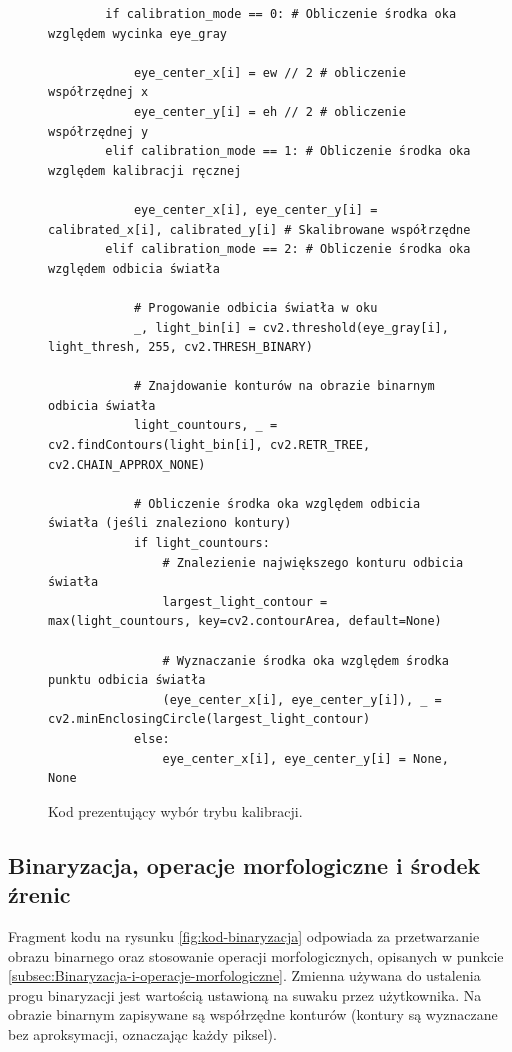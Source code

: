\documentclass[a4paper,twoside,12pt]{book}
\begin{document}
\begin{figure}[htbp]
	\centering
	\begin{lstlisting}
		if calibration_mode == 0: # Obliczenie środka oka względem wycinka eye_gray

			eye_center_x[i] = ew // 2 # obliczenie współrzędnej x
			eye_center_y[i] = eh // 2 # obliczenie współrzędnej y
		elif calibration_mode == 1: # Obliczenie środka oka względem kalibracji ręcznej

			eye_center_x[i], eye_center_y[i] = calibrated_x[i], calibrated_y[i] # Skalibrowane współrzędne
		elif calibration_mode == 2: # Obliczenie środka oka względem odbicia światła
		
			# Progowanie odbicia światła w oku
			_, light_bin[i] = cv2.threshold(eye_gray[i], light_thresh, 255, cv2.THRESH_BINARY)

			# Znajdowanie konturów na obrazie binarnym odbicia światła
			light_countours, _ = cv2.findContours(light_bin[i], cv2.RETR_TREE, cv2.CHAIN_APPROX_NONE)
								
			# Obliczenie środka oka względem odbicia światła (jeśli znaleziono kontury)
			if light_countours:
				# Znalezienie największego konturu odbicia światła
				largest_light_contour = max(light_countours, key=cv2.contourArea, default=None)

				# Wyznaczanie środka oka względem środka punktu odbicia światła
				(eye_center_x[i], eye_center_y[i]), _ = cv2.minEnclosingCircle(largest_light_contour)
			else:
				eye_center_x[i], eye_center_y[i] = None, None
	\end{lstlisting}
\caption{Kod prezentujący wybór trybu kalibracji.}
\label{fig:kod-punkt}
\end{figure}

\subsection{Binaryzacja, operacje morfologiczne i środek źrenic}
\label{subsec:Binaryzacja-operacje-morfologiczne-i-srodek-srenic}

Fragment kodu na rysunku \ref{fig:kod-binaryzacja} odpowiada za przetwarzanie obrazu binarnego oraz stosowanie operacji morfologicznych, opisanych w punkcie \ref{subsec:Binaryzacja-i-operacje-morfologiczne}. Zmienna używana do ustalenia progu binaryzacji jest wartością ustawioną na suwaku przez użytkownika. Na obrazie binarnym zapisywane są współrzędne konturów (kontury są wyznaczane bez aproksymacji, oznaczając każdy piksel).
\end{document}
